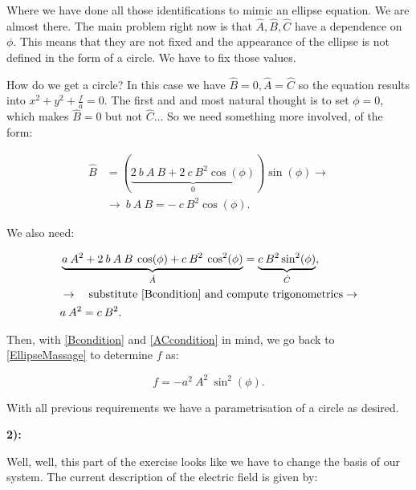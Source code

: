 Where we have done all those identifications to mimic an ellipse equation. We are almost there. The main problem right now is that $\hat{A},\hat{B},\hat{C}$ have a dependence on $\phi$. This means that they are not fixed and the appearance of the ellipse is not defined in the form of a circle. We have to fix those values.

How do we get a circle? In this case we have $\hat{B} = 0, \hat{A}= \hat{C}$ so the equation results into $x^{2} + y^{2} + \tfrac{f}{a} = 0$. The first and and most natural thought is to set $\phi  = 0$, which makes $\hat{B} =0 $ but not $\hat{C}$... So we need something more involved, of the form:

\begin{equation}\label{Bcondition}
	\begin{split}
		\hat{B} &= \left(\underbrace{2 \: b \: A \: B  + 2 \: c \: B^{2} \cos(\phi)}_{0}\right) \sin (\phi) \rightarrow \\
		 &\rightarrow \: b \: A \: B = - \: c \: B^{2} \cos(\phi).
	\end{split}
\end{equation}

We also need:
	
\begin{equation}\label{ACcondition}
	\begin{split}
		& \underbrace{a \: A^{2} + 2 \: b \: A \: B \: \cos(\phi) + c \: B^{2} \: \cos^{2}(\phi)}_{\hat{A}} = \underbrace{c \: B^{2} \sin^{2}(\phi)}_{\hat{C}},\\
		& \rightarrow \quad \text{substitute \ref{Bcondition} and compute trigonometrics} \rightarrow\\
		& a \: A^{2} = c \: B^{2}.
	\end{split}
\end{equation}

Then, with \ref{Bcondition} and \ref{ACcondition} in mind, we go back to \ref{EllipseMassage} to determine $f$ as:

\begin{equation}\label{fcondition}
	f = - a^{2}\: A^{2} \: \sin^{2}(\phi).
\end{equation}

With all previous requirements we have a parametrisation of a circle as desired.
	
\textbf{2):}

Well, well, this part of the exercise looks like we have to change the basis of our system. The current description of the electric field is given by:

